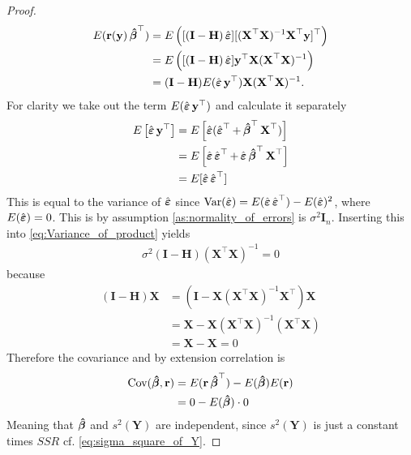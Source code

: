 \begin{proof}
\begin{align} \label{eq:Variance_of_product}
    E(\textbf{r}(\textbf{y}) \operatorname{\boldsymbol{\hat{\beta}}}^\top) &= E \left( [(\textbf{I} - \textbf{H}) \operatorname{\hat{\boldsymbol{\varepsilon}}}] [(\textbf{X}^\top \textbf{X})^{-1} \textbf{X}^\top \textbf{y}]^\top \right) \\
    &= E \left( [(\textbf{I}-\textbf{H}) \operatorname{\hat{\boldsymbol{\varepsilon}}}] \textbf{y}^\top \textbf{X} (\textbf{X}^\top \textbf{X})^{-1} \right) \nonumber \\
    &= (\textbf{I}-\textbf{H}) E(\operatorname{\hat{\boldsymbol{\varepsilon}}} \textbf{y}^\top ) \textbf{X}(\textbf{X}^\top \textbf{X})^{-1}. \nonumber
\end{align}
For clarity we take out the term $E(\operatorname{\hat{\boldsymbol{\varepsilon}}} \textbf{y}^\top )$ and calculate it separately
\begin{align*}
    E \left[ \operatorname{\hat{\boldsymbol{\varepsilon}}} \textbf{y}^\top \right] &= E \left[ \operatorname{\hat{\boldsymbol{\varepsilon}}} (\operatorname{\hat{\boldsymbol{\varepsilon}}}^\top + \operatorname{\boldsymbol{\hat{\beta}}}^\top \textbf{X}^\top) \right] \\
    &= E \left[ \operatorname{\hat{\boldsymbol{\varepsilon}}} \operatorname{\hat{\boldsymbol{\varepsilon}}}^\top + \operatorname{\hat{\boldsymbol{\varepsilon}}} \operatorname{\boldsymbol{\hat{\beta}}}^\top \textbf{X}^\top \right] \\
    &= E[\operatorname{\hat{\boldsymbol{\varepsilon}}} \operatorname{\hat{\boldsymbol{\varepsilon}}}^\top]
\end{align*}
This is equal to the variance of $\operatorname{\hat{\boldsymbol{\varepsilon}}}$ since $\operatorname{\text{Var}}(\operatorname{\hat{\boldsymbol{\varepsilon}}}) = E(\operatorname{\hat{\boldsymbol{\varepsilon}}} \operatorname{\hat{\boldsymbol{\varepsilon}}}^\top) - E(\operatorname{\hat{\boldsymbol{\varepsilon}}})^2$, where $E(\operatorname{\hat{\boldsymbol{\varepsilon}}})=0$.
This is by assumption \ref{as:normality_of_errors} is $\sigma^2 \textbf{I}_n$.
Inserting this into \eqref{eq:Variance_of_product} yields
\begin{align*}
    \sigma^2 (\textbf{I}-\textbf{H})  (\textbf{X}^\top \textbf{X})^{-1} = 0
\end{align*}
because
\begin{align*}
    (\textbf{I}-\textbf{H})\textbf{X} &= (\textbf{I}-\textbf{X}(\textbf{X}^\top \textbf{X})^{-1}\textbf{X}^\top)\textbf{X} \\
    &= \textbf{X} - \textbf{X} (\textbf{X}^\top \textbf{X})^{-1} (\textbf{X}^\top \textbf{X}) \\
    &= \textbf{X} - \textbf{X} = 0
\end{align*}
Therefore the covariance and by extension correlation is
\begin{align*}
    \operatorname{\text{Cov}} (\operatorname{\boldsymbol{\hat{\beta}}}, \textbf{r}) &= E(\textbf{r} \operatorname{\boldsymbol{\hat{\beta}}}^\top) - E(\operatorname{\boldsymbol{\hat{\beta}}}) E(\textbf{r}) \\
    &= 0 - E(\operatorname{\boldsymbol{\hat{\beta}}}) \cdot 0
\end{align*}
Meaning that $\operatorname{\boldsymbol{\hat{\beta}}}$ and $s^2(\textbf{Y})$ are independent, since $s^2(\textbf{Y})$ is just a constant times $SSR$ cf. \eqref{eq:sigma_square_of_Y}.


\end{proof}
